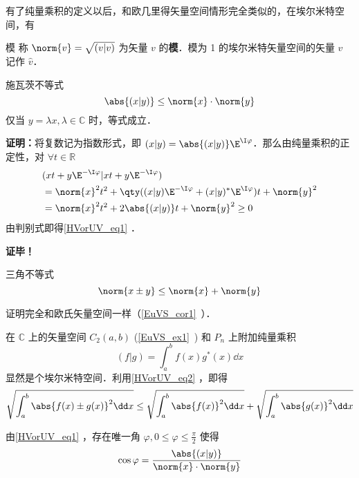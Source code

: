 有了纯量乘积的定义以后，和欧几里得矢量空间情形完全类似的，在埃尔米特空间，有
\begin{definition}{模}
称 $\norm{  v}=\sqrt{(  v|  v)}$ 为矢量 $  v$ 的\textbf{模}．模为 1 的埃尔米特矢量空间的矢量 $v$ 记作 $\hat{v}$．
\end{definition} 
\begin{theorem}{施瓦茨不等式}
\begin{equation}\label{HVorUV_eq1}
\abs{(  x|  y)}\leq \norm{  x}\cdot \norm{  y}
\end{equation}
仅当 $  y=\lambda  x,\lambda\in\mathbb{C}$ 时，等式成立．
\end{theorem}
\textbf{证明：}将复数记为指数形式，即 $(  x|  y)=\abs{(  x|  y)}\E^{\I \varphi}$．那么由纯量乘积的正定性，对 $\forall t\in\mathbb{R}$
\begin{equation}
\begin{aligned}
&(  x t+  y\E^{-\I\varphi}|  x t+  y\E^{-\I\varphi})\\
&=\norm{  x}^2t^2+\qty((  x|  y)\E^{-\I\varphi}+(  x|  y)^*\E^{\I\varphi})t+\norm{  y}^2\\
&=\norm{  x}^2t^2+2\abs{(  x|  y)}t+\norm{  y}^2\geq0
\end{aligned}
\end{equation}
由判别式即得\autoref{HVorUV_eq1} ．

\textbf{证毕！}
\begin{corollary}{三角不等式}
\begin{equation}\label{HVorUV_eq2}
\norm{  x\pm  y}\leq\norm{  x}+\norm{  y}
\end{equation}
\end{corollary}
证明完全和欧氏矢量空间一样（\autoref{EuVS_cor1}~）．
\begin{example}{}
在 $\mathbb{C}$ 上的矢量空间 $C_2(a,b)$ (\autoref{EuVS_ex1}~) 和 $P_n$ 上附加纯量乘积
\begin{equation}
(f|g)=\int_a^{b}f(x)g^*(x)\dd x
\end{equation}
显然是个埃尔米特空间．利用\autoref{HVorUV_eq2} ，即得
\begin{equation}
\sqrt{\int_a^b\abs{f(x)\pm g(x)}^2\dd x}\leq\sqrt{\int_a^b\abs{f(x)}^2\dd x}+\sqrt{\int_a^b\abs{g(x)}^2\dd x}
\end{equation}
\end{example}
由\autoref{HVorUV_eq1} ，存在唯一角 $\varphi,0\leq\varphi\leq\frac{\pi}{2}$ 使得
\begin{equation}
\cos\varphi=\frac{\abs{(  x|  y)}}{\norm{  x}\cdot \norm{  y}}
\end{equation}
